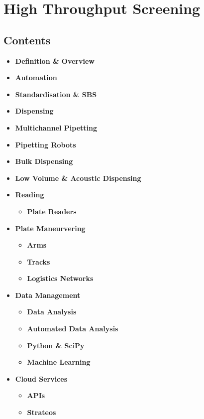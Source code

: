 \hypertarget{high-throughput-screening-2}{%
\section{High Throughput Screening}\label{high-throughput-screening-2}}

\hypertarget{contents-18}{%
\subsection{Contents}\label{contents-18}}

\begin{itemize}
\tightlist
\item
  \textbf{Definition \& Overview}
\item
  \textbf{Automation}
\item
  \textbf{Standardisation \& SBS}
\item
  \textbf{Dispensing}
\item
  \textbf{Multichannel Pipetting}
\item
  \textbf{Pipetting Robots}
\item
  \textbf{Bulk Dispensing}
\item
  \textbf{Low Volume \& Acoustic Dispensing}
\item
  \textbf{Reading}

  \begin{itemize}
  \tightlist
  \item
    \textbf{Plate Readers}
  \end{itemize}
\item
  \textbf{Plate Maneurvering}

  \begin{itemize}
  \tightlist
  \item
    \textbf{Arms}
  \item
    \textbf{Tracks}
  \item
    \textbf{Logistics Networks}
  \end{itemize}
\item
  \textbf{Data Management}

  \begin{itemize}
  \tightlist
  \item
    \textbf{Data Analysis}
  \item
    \textbf{Automated Data Analysis}
  \item
    \textbf{Python \& SciPy}
  \item
    \textbf{Machine Learning}
  \end{itemize}
\item
  \textbf{Cloud Services}

  \begin{itemize}
  \tightlist
  \item
    \textbf{APIs}
  \item
    \textbf{Strateos}
  \end{itemize}
\end{itemize}

